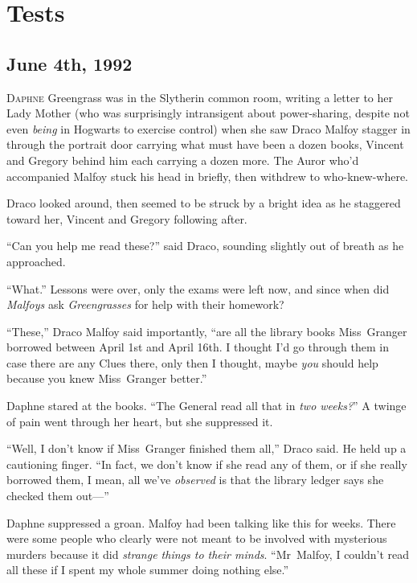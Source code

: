 \chapter{Tests}

\section{June 4th, 1992}

\lettrine{D}{aphne} Greengrass was in the Slytherin common room, writing a letter to her Lady Mother (who was surprisingly intransigent about power-sharing, despite not even \emph{being} in Hogwarts to exercise control) when she saw Draco Malfoy stagger in through the portrait door carrying what must have been a dozen books, Vincent and Gregory behind him each carrying a dozen more. The Auror who’d accompanied Malfoy stuck his head in briefly, then withdrew to who-knew-where.

Draco looked around, then seemed to be struck by a bright idea as he staggered toward her, Vincent and Gregory following after.

“Can you help me read these?” said Draco, sounding slightly out of breath as he approached.

“What.” Lessons were over, only the exams were left now, and since when did \emph{Malfoys} ask \emph{Greengrasses} for help with their homework?

“These,” Draco Malfoy said importantly, “are all the library books Miss~Granger borrowed between April 1st and April 16th. I thought I’d go through them in case there are any Clues there, only then I thought, maybe \emph{you} should help because you knew Miss~Granger better.”

Daphne stared at the books.
“The General read all that in \emph{two weeks?}” A twinge of pain went through her heart, but she suppressed it.

“Well, I don’t know if Miss~Granger finished them all,” Draco said. He held up a cautioning finger.
“In fact, we don’t know if she read any of them, or if she really borrowed them, I mean, all we’ve \emph{observed} is that the library ledger says she checked them out—”

Daphne suppressed a groan. Malfoy had been talking like this for weeks. There were some people who clearly were not meant to be involved with mysterious murders because it did \emph{strange things to their minds}.
“Mr~Malfoy, I couldn’t read all these if I spent my whole summer doing nothing else.”

